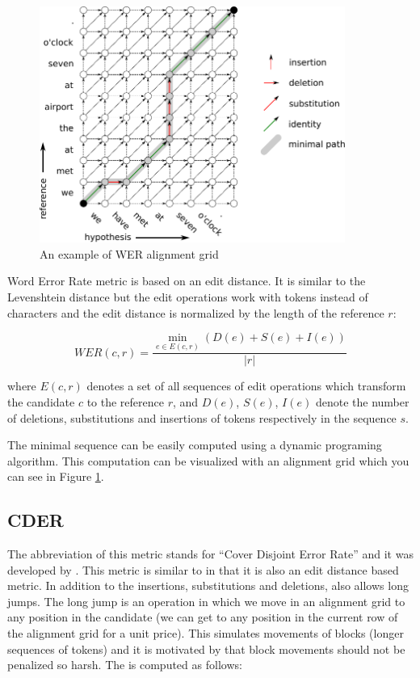 \begin{figure}
    \begin{center}
        \includegraphics[width=10cm]{img/wer-grid.pdf}
    \end{center}

    \caption{An example of WER alignment grid}
    \label{wer-grid}
\end{figure}

Word Error Rate metric is based on an edit distance. It is similar to the Levenshtein
distance but the edit operations work with tokens instead of characters and the edit
distance is normalized by the length of the reference $r$:

\begin{equation*}
    WER(c,r) = \frac{
        \min_{e \in E(c,r)} \left( D(e) + S(e) + I(e) \right)
    }{
        |r|
    }
\end{equation*}

\noindent where $E(c,r)$ denotes a set of all sequences of edit operations
which transform the candidate $c$ to the reference $r$, and $D(e)$, $S(e)$,
$I(e)$ denote the number of deletions, substitutions and insertions of tokens
respectively in the sequence $s$.

The minimal sequence can be easily computed using a dynamic programing algorithm.
This computation can be visualized with an alignment grid which you can see
in Figure \ref{wer-grid}.


\subsection{CDER}

The abbreviation of this metric stands for ``Cover Disjoint Error Rate'' and it
was developed by . This metric is similar to
 in that it is also an edit distance based metric. In addition to the
insertions, substitutions and deletions,  also allows long jumps.
The long jump is an operation in which we move in an alignment grid to any
position in the candidate (we can get to any position in the current row of the
alignment grid for a unit price). This simulates movements of blocks (longer
sequences of tokens) and it is motivated by that block movements should not be
penalized so harsh. The  is computed as follows:

